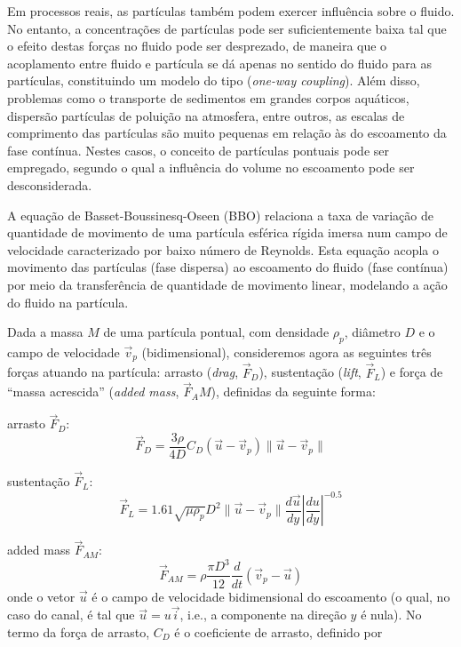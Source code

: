 Em processos reais, as partículas também podem exercer influência sobre
o fluido. No entanto, a concentrações de partículas pode ser
suficientemente baixa tal que o efeito destas forças no fluido pode ser
desprezado, de maneira que o acoplamento entre fluido e partícula se dá
apenas no sentido do fluido para as partículas, constituindo um modelo
do tipo ({\it one-way coupling}). Além disso, problemas como o
transporte de sedimentos em grandes corpos aquáticos, dispersão
partículas de poluição na atmosfera, entre outros, as escalas de
comprimento das partículas são muito pequenas em relação às do
escoamento da fase contínua. Nestes casos, o conceito de partículas
pontuais pode ser empregado, segundo o qual a influência do volume no
escoamento pode ser desconsiderada.


A equação de Basset-Boussinesq-Oseen (BBO) relaciona a taxa de variação
de quantidade de movimento de uma partícula esférica rígida imersa num
campo de velocidade caracterizado por baixo número de Reynolds. Esta
equação acopla o movimento das partículas (fase dispersa) ao escoamento
do fluido (fase contínua) por meio da transferência de quantidade de
movimento linear, modelando a ação do fluido na partícula. 


Dada a massa $M$ de uma partícula pontual, com densidade $\rho_p$,
diâmetro $D$ e o campo de velocidade $\vec{v}_p$
(bidimensional), consideremos agora as seguintes três forças atuando na
partícula: arrasto ({\it drag}, $\vec{F}_D$), sustentação ({\it lift},
$\vec{F}_L$) e força de ``massa acrescida'' ({\it added mass},
$\vec{F}_AM$), definidas da seguinte forma:

arrasto $\vec{F}_D$:
\begin{equation}
\vec{F}_D = \frac{3\rho}{4D}C_D(\vec{u}-\vec{v}_p)\parallel\vec{u}-\vec{v}_p\parallel
\label{eq:arrasto}
\end{equation}

sustentação $\vec{F}_L$:
\begin{equation}
\vec{F}_L = 1.61\sqrt{\mu\rho_p}D^2\parallel\vec{u}-\vec{v}_p\parallel\frac{d\vec{u}}{dy}\left|\frac{du}{dy}\right|^{-0.5}
\label{eq:sustentacao}
\end{equation}

added mass $\vec{F}_{AM}$:
\begin{equation}
\vec{F}_{AM} = \rho\frac{\pi D^3}{12}\frac{d}{dt}(\vec{v}_p-\vec{u})
\label{eq:added_mass}
\end{equation}
onde o vetor $\vec{u}$ é o campo de velocidade bidimensional do
escoamento (o qual, no caso do canal, é tal que $\vec{u}=u\vec{i}$,
i.e., a componente na direção $y$ é nula). No termo da força de arrasto,
$C_D$ é o coeficiente de arrasto, definido por \cite{PERRY99}


